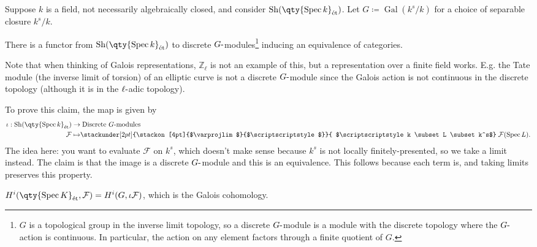 \begin{example}[?]

Suppose \(k\) is a field, not necessarily algebraically closed, and
consider \({\operatorname{Sh}}(\qty{\operatorname{Spec}k}_\text{ét})\).
Let \(G \coloneqq\operatorname{Gal}(k^s/k)\) for a choice of separable
closure \(k^s/k\).

\begin{claim}

There is a functor from
\({\operatorname{Sh}}(\qty{\operatorname{Spec}k}_\text{ét})\) to
discrete \(G{\hbox{-}}\)modules\footnote{\(G\) is a topological group in
  the inverse limit topology, so a discrete \(G{\hbox{-}}\)module is a
  module with the discrete topology where the \(G{\hbox{-}}\)action is
  continuous. In particular, the action on any element factors through a
  finite quotient of \(G\).} inducing an equivalence of categories.

\end{claim}

Note that when thinking of Galois representations,
\({\mathbb{Z}}_{\ell}\) is not an example of this, but a representation
over a finite field works. E.g. the Tate module (the inverse limit of
torsion) of an elliptic curve is not a discrete \(G{\hbox{-}}\)module
since the Galois action is not continuous in the discrete topology
(although it is in the \(\ell{\hbox{-}}\)adic topology).

To prove this claim, the map is given by
\begin{align*}  
\iota: {\operatorname{Sh}}(\qty{\operatorname{Spec}k}_\text{ét}) &\to \text{Discrete $G{\hbox{-}}$modules} \\
\mathcal{F} &\mapsto 
  \mathrel{\stackunder[2pt]{\stackon[4pt]{$\varprojlim$}{$\scriptscriptstyle$}}{
  $\scriptscriptstyle k \subset L \subset k^s$}}
\mathcal{F}(\operatorname{Spec}L)
.\end{align*}
The idea here: you want to evaluate \(\mathcal{F}\) on \(k^s\), which
doesn't make sense because \(k^s\) is not locally finitely-presented, so
we take a limit instead. The claim is that the image is a discrete
\(G{\hbox{-}}\)module and this is an equivalence. This follows because
each term is, and taking limits preserves this property.

\end{example}

\begin{corollary}[?]

\(H^i(\qty{\operatorname{Spec}K}_\text{ét}, \mathcal{F} ) = H^i(G,\iota \mathcal{F})\),
which is the Galois cohomology.

\end{corollary}

